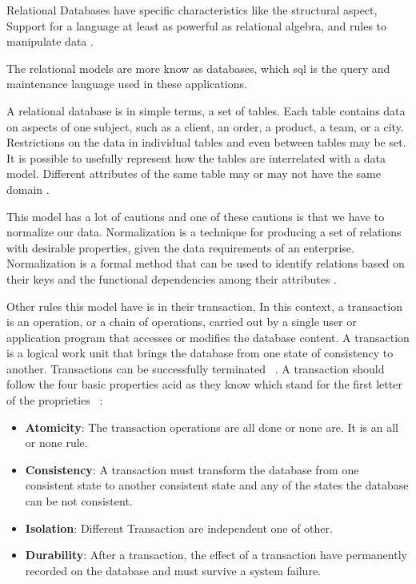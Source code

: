     Relational Databases have specific characteristics like the structural aspect, Support for a language at least as powerful as relational algebra, and rules to manipulate data \cite{10.1145/320107.320109}.
    
    The relational models are more know as  databases, which \gls{sql} is the query and maintenance language used in these applications.
    
    A relational database is in simple terms, a set of tables. Each table contains data on aspects of one subject, such as a client, an order, a product, a team, or a city. Restrictions on the data in individual tables and even between tables may be set. It is possible to usefully represent how the tables are interrelated with a data model. Different attributes of the same table may or may not have the same domain \cite{bsql}.
 
    This model has a lot of cautions and one of these cautions is that we have to normalize our data. Normalization is a technique for producing a set of relations with desirable properties, given the data requirements of an enterprise. Normalization is a formal method that can be used to identify relations based on their keys and the functional dependencies among their attributes \cite{begg}.

    Other rules this model have is in their transaction, In this context, a transaction is an operation, or a chain of operations, carried out by a single user or application program that accesses or modifies the database content. A transaction is a logical work unit that brings the database from one state of consistency to another. Transactions can be successfully terminated ~\cite{begg}.  A transaction should follow the four basic properties \gls{acid} as they know which stand for the first letter of the proprieties ~\cite{10.1145/289.291}:
\begin{itemize}
    \item \textbf{Atomicity}: The transaction operations are all done or none are. It is an all or none rule.
    \item \textbf{Consistency}: A transaction must transform the database from one consistent state to another consistent state and any of the states the database can be not consistent.
    \item \textbf{Isolation}: Different Transaction are independent one of other.
    \item \textbf{Durability}: After a transaction, the effect of a transaction have permanently recorded on the database and must survive a system failure.
\end{itemize}

